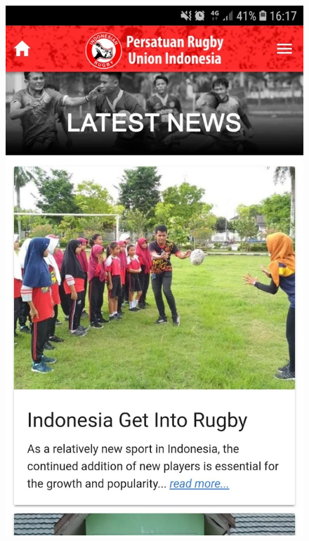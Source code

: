 \documentclass[a4paper,twoside]{article}
\begin{document}
\begin{figure} [!h]
    \centering
    \includegraphics[scale=0.125]{Images/latest_news.png} \hspace{0.5cm}

\end{figure}
\end{document}
